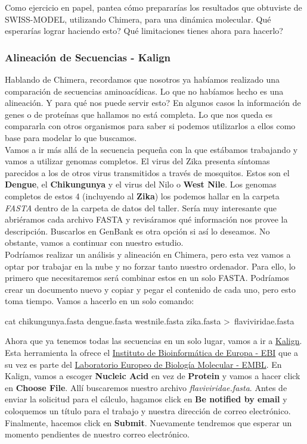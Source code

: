 \documentclass[10pt,letterpaper]{article}
\newenvironment{Code}
{
\begin{lrbox}{\selvestebox}%
\begin{minipage}{\dimexpr\columnwidth-2\fboxsep\relax}
\fontfamily{\ttdefault}\selectfont
}
{\end{minipage}\end{lrbox}%
\begin{center}
\colorbox{light-gray}{\usebox{\selvestebox}}
\end{center}
}
\begin{document}
Como ejercicio en papel, pantea c\'omo preparar\'ias los resultados que obtuviste de SWISS-MODEL, utilizando Chimera, para una din\'amica molecular. Qu\'e esperar\'ias lograr haciendo esto? Qu\'e limitaciones tienes ahora para hacerlo?

\subsubsection{Alineaci\'on de Secuencias - Kalign}
Hablando de Chimera, recordamos que nosotros ya hab\'iamos realizado una comparaci\'on de secuencias aminoac\'idicas. Lo que no hab\'iamos hecho es una alineaci\'on. Y para qu\'e nos puede servir esto? En algunos casos la informaci\'on de genes o de prote\'inas que hallamos no est\'a completa. Lo que nos queda es compararla con otros organismos para saber si podemos utilizarlos a ellos como base para modelar lo que buscamos.\\

Vamos a ir m\'as all\'a de la secuencia peque\~na con la que est\'abamos trabajando y vamos a utilizar genomas completos. El virus del Zika presenta s\'intomas parecidos a los de otros virus transmitidos a trav\'es de mosquitos. Estos son el \textbf{Dengue}, el \textbf{Chikungunya} y el virus del Nilo o \textbf{West Nile}. Los genomas completos de estos 4 (incluyendo al \textbf{Zika}) los podemos hallar en la carpeta \textit{FASTA} dentro de la carpeta de datos del taller. Ser\'ia muy interesante que abri\'eramos cada archivo FASTA y revis\'aramos qu\'e informaci\'on nos provee la descripci\'on. Buscarlos en GenBank es otra opci\'on si as\'i lo deseamos. No obstante, vamos a continuar con nuestro estudio.\\

Podr\'iamos realizar un an\'alisis y alineaci\'on en Chimera, pero esta vez vamos a optar por trabajar en la nube y no forzar tanto nuestro ordenador. Para ello, lo primero que necesitaremos ser\'a combinar estos en un solo FASTA. Podr\'iamos crear un documento nuevo y copiar y pegar el contenido de cada uno, pero esto toma tiempo. Vamos a hacerlo en un solo comando:

\begin{Code}
cat chikungunya.fasta dengue.fasta westnile.fasta zika.fasta >\ flaviviridae.fasta
\end{Code}

Ahora que ya tenemos todas las secuencias en un solo lugar, vamos a ir a \href{http://www.ebi.ac.uk/Tools/msa/kalign/}{Kalign}. Esta herramienta la ofrece el \href{http://www.ebi.ac.uk/}{Instituto de Bioinform\'atica de Europa - EBI} que a su vez es parte del \href{http://embl.org/}{Laboratorio Europeo de Biolog\'ia Molecular - EMBL}. En Kalign, vamos a escoger \textbf{Nucleic Acid} en vez de \textbf{Protein} y vamos a hacer click en \textbf{Choose File}. All\'i buscaremos nuestro archivo \textit{flaviviridae.fasta}. Antes de enviar la solicitud para el c\'alculo, hagamos click en \textbf{Be notified by email} y coloquemos un t\'itulo para el trabajo y nuestra direcci\'on de correo electr\'onico. Finalmente, hacemos click en \textbf{Submit}. Nuevamente tendremos que esperar un momento pendientes de nuestro correo electr\'onico.\\
\end{document}
